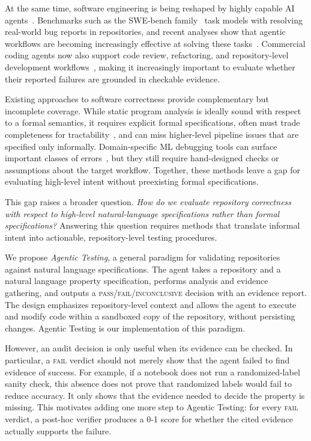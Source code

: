 \documentclass[11pt]{article}
\begin{document}
At the same time, software engineering is being reshaped by highly capable AI agents~\citep{metr2025longtasks}.
Benchmarks such as the SWE-bench family~\citep{jimenez2024swebench,swebench-verified} task models with resolving real-world bug reports in repositories, and recent analyses show that agentic workflows are becoming increasingly effective at solving these tasks~\citep{jimenez2024swebench,xia2024agentless,guo2025repoaudit}.
Commercial coding agents now also support code review, refactoring, and repository-level development workflows~\citep{openai_codex}, making it increasingly important to evaluate whether their reported failures are grounded in checkable evidence.

Existing approaches to software correctness provide complementary but incomplete coverage.
While static program analysis is ideally sound with respect to a formal semantics, it requires explicit formal specifications, often must trade completeness for tractability~\citep{cousot1979systematic,nielson1999principles}, and can miss higher-level pipeline issues that are specified only informally.
Domain-specific ML debugging tools can surface important classes of errors~\citep{schoop2021umlaut}, but they still require hand-designed checks or assumptions about the target workflow.
Together, these methods leave a gap for evaluating high-level intent without preexisting formal specifications.

This gap raises a broader question.
\textit{How do we evaluate repository correctness with respect to high-level natural-language specifications rather than formal specifications?}
Answering this question requires methods that translate informal intent into actionable, repository-level testing procedures.

We propose \emph{Agentic Testing}, a general paradigm for validating repositories against natural language specifications.
The agent takes a repository and a natural language property specification, performs analysis and evidence gathering, and outputs a \textsc{pass}/\textsc{fail}/\textsc{inconclusive} decision with an evidence report.
The design emphasizes repository-level context and allows the agent to execute and modify code within a sandboxed copy of the repository, without persisting changes.
Agentic Testing is our implementation of this paradigm.

However, an audit decision is only useful when its evidence can be checked.
In particular, a \textsc{fail} verdict should not merely show that the agent failed to find evidence of success.
For example, if a notebook does not run a randomized-label sanity check, this absence does not prove that randomized labels would fail to reduce accuracy.
It only shows that the evidence needed to decide the property is missing.
This motivates adding one more step to Agentic Testing: for every \textsc{fail} verdict, a post-hoc verifier produces a 0-1 score for whether the cited evidence actually supports the failure.
\end{document}
